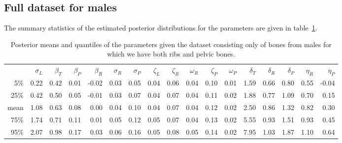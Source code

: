 \documentclass{article}
\begin{document}
\subsection{Full dataset for males}

The summary statistics of the estimated posterior distributions 
for the parameters
are given in table~\ref{tab:complete_males_posterior_distrns}.

\begin{table}[ht]
    \footnotesize
\centering
\begin{tabular}{rrrrrrrrrrrrrrrrr}
  \hline
        &  $\sigma_L$  &  $\beta_T$  &  $\beta_P$  &  $\beta_R$  &  $\sigma_R$  &  $\sigma_P$  &  $\zeta_L$  &  $\zeta_R$  &  $\omega_R$  &  $\zeta_P$  &  $\omega_P$  &  $\delta_T$  &  $\delta_R$  &  $\delta_P$  &  $\eta_R$  &  $\eta_P$  \\
5\%     &  0.22    &  0.42   &  0.01   &  -0.02  &  0.03    &  0.05    &  0.04   &  0.06   &  0.04    &  0.10   &  0.01    &  1.59     &  0.66     &    0.80     & 0.55     & -0.04    \\
25\%    &  0.42    &  0.50   &  0.05   &  -0.01  &  0.03    &  0.07    &  0.04   &  0.07   &  0.04    &  0.11   &  0.02    &  1.88     &  0.77     &    1.09     & 0.70     & 0.15     \\
mean  &  1.08    &  0.63   &  0.08   &  0.00   &  0.04    &  0.10    &  0.04   &  0.07   &  0.04    &  0.12   &  0.02    &  2.50     &  0.86     &    1.32     & 0.82     & 0.30     \\
75\%    &  1.74    &  0.71   &  0.11   &  0.01   &  0.05    &  0.12    &  0.05   &  0.07   &  0.04    &  0.13   &  0.02    &  5.55     &  0.93     &    1.51     & 0.93     & 0.45     \\
95\%    &  2.07    &  0.98   &  0.17   &  0.03   &  0.06    &  0.16    &  0.05   &  0.08   &  0.05    &  0.14   &  0.02    &  7.95     &  1.03     &    1.87     & 1.10     & 0.64     \\
   \hline
\end{tabular}
\caption{ \label{tab:complete_males_posterior_distrns} Posterior means and quantiles of the parameters given the dataset consisting only of bones from males for which we have both ribs and pelvic bones.}
\end{table}
\end{document}
